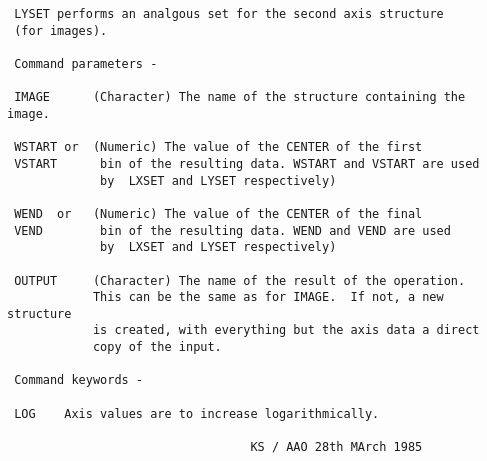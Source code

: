 \begin{description}
\begin{verbatim}
 LYSET performs an analgous set for the second axis structure
 (for images).

 Command parameters -

 IMAGE      (Character) The name of the structure containing the image.

 WSTART or  (Numeric) The value of the CENTER of the first
 VSTART      bin of the resulting data. WSTART and VSTART are used
             by  LXSET and LYSET respectively)

 WEND  or   (Numeric) The value of the CENTER of the final
 VEND        bin of the resulting data. WEND and VEND are used
             by  LXSET and LYSET respectively)

 OUTPUT     (Character) The name of the result of the operation.
            This can be the same as for IMAGE.  If not, a new structure
            is created, with everything but the axis data a direct
            copy of the input.

 Command keywords -

 LOG    Axis values are to increase logarithmically.

                                  KS / AAO 28th MArch 1985
\end{verbatim}
\end{description}
